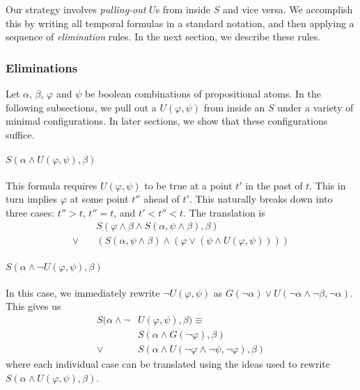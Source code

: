 \documentclass[a4paper,UKenglish,cleveref, autoref, thm-restate, numberwithinsect]{lipics-v2021}
\begin{document}
Our strategy involves \textit{pulling-out} $U$s from inside $S$ and vice versa. We accomplish this by writing all temporal formulas in a standard notation, and then applying a sequence of \textit{elimination} rules. In the next section, we describe these rules.

\subsubsection{Eliminations}
\label{sec:eliminations-linear}

Let $\alpha$, $\beta$, $\varphi$ and $\psi$ be boolean combinations of propositional atoms. In the following subsections, we pull out a $U(\varphi, \psi)$ from inside an $S$ under a variety of minimal configurations. In later sections, we show that these configurations suffice.

\paragraph*{$S(\alpha \land U(\varphi, \psi), \beta)$}
This formula requires $U(\varphi, \psi)$ to be true at a point $t'$ in the past of $t$. This in turn implies $\varphi$ at some point $t''$ ahead of $t'$. This naturally breaks down into three cases: $t'' > t$, $t'' = t$, and $t' < t'' < t$. The translation is
\begin{equation*}
    \begin{aligned}
        &S(\varphi \land \beta \land S(\alpha, \psi \land \beta), \beta)\\
        \lor \quad &\left(S(\alpha, \psi \land \beta) \land \left(\varphi \lor \left(\psi \land U(\varphi, \psi) \right) \right) \right)
    \end{aligned}
\end{equation*}

\paragraph*{$S(\alpha \land \lnot U(\varphi, \psi), \beta)$}
In this case, we immediately rewrite $\lnot U(\varphi, \psi)$ as $G(\lnot \alpha) \lor U(\lnot \alpha \land \lnot \beta, \lnot \alpha)$. This gives us
\begin{equation*}
    \begin{aligned}
        S(\alpha \land \lnot &U(\varphi, \psi), \beta) \equiv\\
        &S(\alpha \land G(\lnot \varphi), \beta) \\
        \lor \quad &S(\alpha \land U(\lnot \varphi \land \lnot \psi, \lnot \varphi), \beta)
    \end{aligned}
\end{equation*}
where each individual case can be translated using the ideas used to rewrite $S(\alpha \land U(\varphi, \psi), \beta)$.
\end{document}
